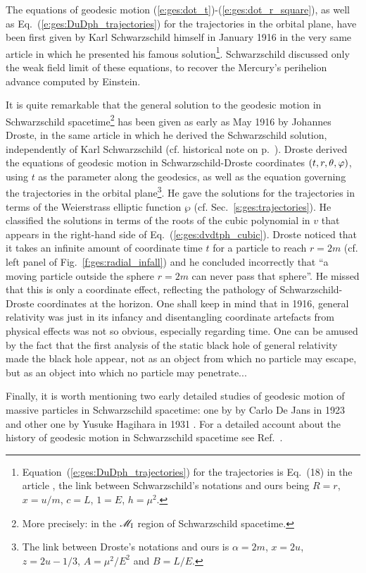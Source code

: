 \begin{hist} \label{h:ges:geod}
The equations of geodesic motion (\ref{e:ges:dot_t})-(\ref{e:ges:dot_r_square}),
as well as Eq.~(\ref{e:ges:DuDph_trajectories}) for the trajectories in the
orbital plane, have been first given by Karl Schwarzschild
himself in January 1916 in the very same article \cite{Schwa1916} in which he presented
his famous solution\footnote{Equation~(\ref{e:ges:DuDph_trajectories}) for the
trajectories is Eq.~(18) in the article \cite{Schwa1916}, the
link between Schwarzschild's notations and ours being $R=r$, $x=u/m$, $c=L$,
$1=E$, $h=\mu^2$.}. Schwarzschild discussed only the weak field limit of these
equations, to recover the Mercury's perihelion advance computed by
Einstein.

It is quite remarkable that the general solution to the geodesic motion
in Schwarzschild spacetime\footnote{More precisely: in the $\mathscr{M}_{\rm I}$ region
of Schwarzschild spacetime.} has been given as early as May 1916 by
Johannes Droste, in the same article \cite{Drost1917} in which
he derived the Schwarzschild solution, independently of Karl Schwarzschild
(cf. historical note on p.~\pageref{h:sch:Schwarzschild_sol}).
Droste derived the equations of geodesic motion in Schwarzschild-Droste coordinates
$(t, r, \theta,\varphi)$, using $t$ as the parameter
along the geodesics, as well as the equation governing
the trajectories in the orbital plane\footnote{The link between Droste's notations
and ours is $\alpha=2m$, $x=2u$, $z = 2u - 1/3$, $A = \mu^2/E^2$ and $B= L/E$.}.
He gave the solutions for the trajectories
in terms of the Weierstrass elliptic function $\wp$ (cf. Sec.~\ref{s:ges:trajectories}).
He classified the solutions in terms of the roots of the cubic polynomial
in $v$ that appears in the right-hand side of Eq.~(\ref{e:ges:dvdtph_cubic}).
Droste noticed that it takes an infinite amount of coordinate time $t$ for a particle
to reach $r=2m$ (cf. left panel of Fig.~\ref{f:ges:radial_infall}) and
he concluded incorrectly that ``a moving particle outside the sphere $r=2m$ can
never pass that sphere''. He missed that this is only a coordinate effect,
reflecting the pathology of Schwarzschild-Droste coordinates at the horizon.
One shall keep in mind that in 1916, general relativity was just in its infancy
and disentangling coordinate artefacts from physical effects was not so obvious,
especially regarding time.
One can be amused by the fact that the first analysis of the static
black hole of general relativity made the black hole appear, not as an object
from which no particle may escape, but as an object into which no particle
may penetrate...

Finally, it is worth mentioning two early detailed studies of geodesic motion
of massive particles in Schwarzschild spacetime: one by
by Carlo De Jans in 1923 \cite{DeJan1923} and other one by
Yusuke Hagihara in 1931 \cite{Hagih1931}.
For a detailed account about the history of geodesic motion in
Schwarzschild spacetime see Ref.~\cite{Eisen87}.
\end{hist}








